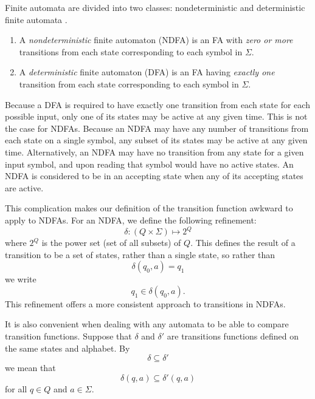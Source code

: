 \documentclass{bcthesis}
\renewcommand{\meo}[1]{}
\newcommand{\footcite}[2]{\xspace\cite[pg.~{#2}]{#1}\xspace}
\begin{document}
		\begin{definition}
			Finite automata are divided into two classes: nondeterministic and deterministic finite automata \footcite{hopcroft}{19}.
			\begin{enumerate}[label=(\roman*)]
				\item A \textit{nondeterministic} finite automaton (NDFA) is an FA with \textit{zero or more} transitions from each state corresponding to each symbol in $\Sigma$.
				\item A \textit{deterministic} finite automaton (DFA) is an FA having \textit{exactly one} transition from each state corresponding to each symbol in $\Sigma$.
			\end{enumerate}
		\end{definition}

		\begin{remark}
			Because a DFA is required to have exactly one transition from each state for each possible input, only one of its states may be active at any given time.
			This is not the case for NDFAs.
			Because an NDFA may have any number of transitions from each state on a single symbol, any subset of its states may be active at any given time.
			Alternatively, an NDFA may have no transition from any state for a given input symbol, and upon reading that symbol would have no active states.
			An NDFA is considered to be in an accepting state when any of its accepting states are active.

			This complication makes our definition of the transition function awkward to apply to NDFAs.
			For an NDFA, we define the following refinement:
			\[
				\delta : (Q \times \Sigma) \mapsto 2^Q
			\]
			where $2^Q$ is the power set (set of all subsets) of $Q$.
			This defines the result of a transition to be a set of states, rather than a single state, so rather than
			\[
				\delta(q_0, a) = q_1
			\]
			we write
			\[
				q_1 \in \delta(q_0, a).
			\]
			This refinement offers a more consistent approach to transitions in NDFAs.

			It is also convenient when dealing with any automata to be able to compare transition functions.
			Suppose that $\delta$ and $\delta'$ are transitions functions defined on the same states and alphabet.
			By
			\[
				\delta \subseteq \delta'
			\]
			we mean that
			\[
				\delta(q, a) \subseteq \delta'(q, a)
			\]
			for all $q \in Q$ and $a \in \Sigma$.

			\meo{I could mention lambda transitions, but I've avoided using them so far, so I don't think I need to.}

		\end{remark}
\end{document}
